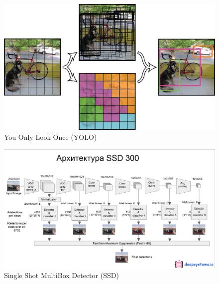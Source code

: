 \documentclass[presentation]{beamer}
\begin{document}
\begin{frame}[allowframebreaks]
    \begin{figure}
        \centering
        \includegraphics[width=0.9\linewidth]{2_3.png}
        \caption{You Only Look Once (YOLO)}
    \end{figure}

    \begin{figure}
        \centering
        \includegraphics[width=\linewidth]{2_4.png}
        \caption{Single Shot MultiBox Detector (SSD)}
    \end{figure}

\end{frame}
\end{document}

